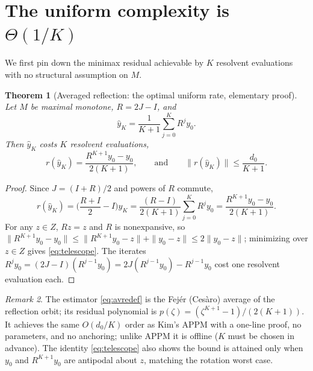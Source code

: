 \documentclass[11pt]{article}
\newtheorem{theorem}{Theorem}[section]
\theoremstyle{definition}
\theoremstyle{remark}
\newtheorem{remark}[theorem]{Remark}
\newcommand{\norm}[1]{\| #1 \|}
\begin{document}
\section{The uniform complexity is $\Theta(1/K)$}\label{sec:uniform}

We first pin down the minimax residual achievable by $K$ resolvent
evaluations with no structural assumption on $M$.

\begin{theorem}[Averaged reflection: the optimal uniform rate, elementary
proof]\label{thm:avref}
Let $M$ be maximal monotone, $R=2J-I$, and
\begin{equation}\label{eq:avredef}
\hat y_K=\frac1{K+1}\sum_{j=0}^{K} R^j y_0 .
\end{equation}
Then $\hat y_K$ costs $K$ resolvent evaluations,
\begin{equation}\label{eq:telescope}
r(\hat y_K)=\frac{R^{K+1}y_0-y_0}{2(K+1)},
\qquad\text{and}\qquad
\norm{r(\hat y_K)}\le \frac{d_0}{K+1}.
\end{equation}
\end{theorem}
\begin{proof}
Since $J=(I+R)/2$ and powers of $R$ commute,
\[
r(\hat y_K)=\Big(\frac{R+I}{2}-I\Big)\hat y_K
=\frac{(R-I)}{2(K+1)}\sum_{j=0}^K R^jy_0
=\frac{R^{K+1}y_0-y_0}{2(K+1)} .
\]
For any $z\in Z$, $Rz=z$ and $R$ is nonexpansive, so
$\norm{R^{K+1}y_0-y_0}\le \norm{R^{K+1}y_0-z}+\norm{y_0-z}\le 2\norm{y_0-z}$;
minimizing over $z\in Z$ gives \eqref{eq:telescope}. The iterates
$R^jy_0=(2J-I)(R^{j-1}y_0)=2J(R^{j-1}y_0)-R^{j-1}y_0$ cost one resolvent
evaluation each.
\end{proof}

\begin{remark}\label{rem:avref}
The estimator \eqref{eq:avredef} is the Fej\'er (Ces\`aro) average of the
reflection orbit; its residual polynomial is
$p(\zeta)=(\zeta^{K+1}-1)/(2(K+1))$. It achieves the same $O(d_0/K)$ order as
Kim's APPM \cite{kim2021accelerated} with a one-line proof, no parameters,
and no anchoring; unlike APPM it is offline ($K$ must be chosen in advance).
The identity \eqref{eq:telescope} also shows the bound is attained only when
$y_0$ and $R^{K+1}y_0$ are antipodal about $z$, matching the rotation worst
case.
\end{remark}
\end{document}
